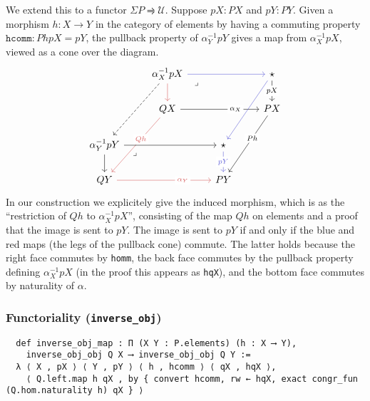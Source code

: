 \documentclass{article}
\newcommand{\functor}{\rightrightharpoons}
\newcommand{\al}{\alpha}
\newcommand{\UU}{\mathcal{U}}
\newcommand{\<}{\langle}
\renewcommand{\>}{\rangle}
\theoremstyle{definitionstyle}
\theoremstyle{exercisestyle}
\theoremstyle{remarkstyle}
\begin{document}
We extend this to a functor $\Sigma P \functor \UU$.
Suppose $pX : P X$ and $pY : P Y$.
Given a morphism $h : X \to Y$ in the category of elements by having a
commuting property $\texttt{hcomm}: P h pX = pY$,
the pullback property of $\al_{Y}^{-1} pY$ gives a map
from $\al_{X}^{-1} pX$, viewed as a cone over the diagram.
\[\begin{tikzcd}
	& {\alpha_X^{-1}pX} && \star \\
	& {Q X} && {P X} \\
	{\alpha_Y^{-1}pY} && \star \\
	{Q Y} && {P Y}
	\arrow[color={rgb,255:red,92;green,92;blue,214}, from=1-2, to=1-4]
	\arrow["pX"{description}, from=1-4, to=2-4]
	\arrow[color={rgb,255:red,214;green,92;blue,92}, from=1-2, to=2-2]
	\arrow["{\alpha_X}"{description, pos=0.7}, from=2-2, to=2-4]
	\arrow[dashed, from=1-2, to=3-1]
	\arrow["Qh"{description, pos=0.4}, color={rgb,255:red,214;green,92;blue,92}, from=2-2, to=4-1]
	\arrow[from=3-1, to=3-3]
	\arrow["{P h}"{description, pos=0.4}, from=2-4, to=4-3]
	\arrow["{\alpha_Y}"{description, pos=0.7}, color={rgb,255:red,214;green,92;blue,92}, from=4-1, to=4-3]
	\arrow[from=3-1, to=4-1]
	\arrow[color={rgb,255:red,92;green,92;blue,214}, from=1-4, to=3-3]
	\arrow["pY"{description}, color={rgb,255:red,92;green,92;blue,214}, from=3-3, to=4-3]
	\arrow["\lrcorner"{anchor=center, pos=0.125}, draw=none, from=3-1, to=4-3]
	\arrow["\lrcorner"{anchor=center, pos=0.125}, draw=none, from=1-2, to=2-4]
\end{tikzcd}\]
In our construction we explicitely give the induced morphism,
which is as the ``restriction of $Q h$ to $\al_{X}^{-1} pX$'',
consisting of the map $Q h$ on elements and a proof that the image is sent to
$pY$.
The image is sent to $pY$ if and only if the blue and red maps
(the legs of the pullback cone) commute.
The latter holds because the right face commutes by \texttt{homm},
the back face commutes by the pullback property defining $\al_{X}^{-1}pX$
(in the proof this appears as \texttt{hqX}),
and the bottom face commutes by naturality of $\alpha$.

\subsubsection{ Functoriality (\texttt{inverse\_obj})}

\begin{lstlisting}
  def inverse_obj_map : Π (X Y : P.elements) (h : X ⟶ Y),
    inverse_obj_obj Q X ⟶ inverse_obj_obj Q Y :=
  λ ⟨ X , pX ⟩ ⟨ Y , pY ⟩ ⟨ h , hcomm ⟩ ⟨ qX , hqX ⟩,
    ⟨ Q.left.map h qX , by { convert hcomm, rw ← hqX, exact congr_fun (Q.hom.naturality h) qX } ⟩ \end{lstlisting}
\end{document}
